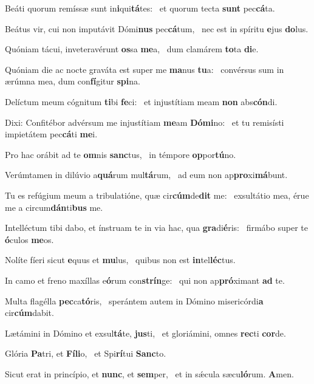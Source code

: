 \item Beáti quorum remíssæ sunt in\textbf{i}qui\textbf{tá}tes:~\psstar{} et quorum tecta \textbf{sunt} pec\textbf{cá}ta.
\item Beátus vir, cui non imputávit Dómi\textbf{nus} pec\textbf{cá}tum,~\psstar{} nec est in spíritu \textbf{e}jus \textbf{do}lus.
\item Quóniam tácui, inveteravérunt \textbf{os}sa \textbf{me}a,~\psstar{} dum clamárem \textbf{to}ta \textbf{di}e.
\item Quóniam die ac nocte graváta est super me \textbf{ma}nus \textbf{tu}a:~\psstar{} convérsus sum in ærúmna mea, dum con\textbf{fí}gitur \textbf{spi}na.
\item Delíctum meum cógnitum \textbf{ti}bi \textbf{fe}ci:~\psstar{} et injustítiam meam \textbf{non} abs\textbf{cón}di.
\item Dixi: Confitébor advérsum me injustítiam \textbf{me}am \textbf{Dó}\textbf{mi}no:~\psstar{} et tu remisísti impietátem pec\textbf{cá}ti \textbf{me}i.
\item Pro hac orábit ad te \textbf{om}nis \textbf{sanc}tus,~\psstar{} in témpore \textbf{op}por\textbf{tú}no.
\item Verúmtamen in dilúvio a\textbf{quá}rum mul\textbf{tá}rum,~\psstar{} ad eum non ap\textbf{pro}xi\textbf{má}bunt.
\item Tu es refúgium meum a tribulatióne, quæ cir\textbf{cúm}de\textbf{dit} me:~\psstar{} exsultátio mea, érue me a circum\textbf{dán}ti\textbf{bus} me.
\item Intelléctum tibi dabo, et ínstruam te in via hac, qua \textbf{gra}di\textbf{é}ris:~\psstar{} firmábo super te \textbf{ó}culos \textbf{me}os.
\item Nolíte fíeri sicut \textbf{e}quus et \textbf{mu}lus,~\psstar{} quibus non est \textbf{in}tel\textbf{léc}tus.
\item In camo et freno maxíllas e\textbf{ó}rum con\textbf{strín}ge:~\psstar{} qui non ap\textbf{pró}ximant \textbf{ad} te.
\item Multa flagélla \textbf{pec}ca\textbf{tó}ris,~\psstar{} sperántem autem in Dómino misericórdi\textbf{a} cir\textbf{cúm}dabit.
\item Lætámini in Dómino et exsul\textbf{tá}te, \textbf{jus}ti,~\psstar{} et gloriámini, omnes \textbf{rec}ti \textbf{cor}de.
\item Glória \textbf{Pa}tri, et \textbf{Fí}\textbf{li}o,~\psstar{} et Spi\textbf{rí}tui \textbf{Sanc}to.
\item Sicut erat in princípio, et \textbf{nunc}, et \textbf{sem}per,~\psstar{} et in sǽcula sæcu\textbf{ló}rum. \textbf{A}men.
